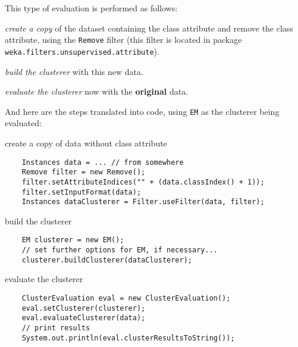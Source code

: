 This type of evaluation is performed as follows:
\begin{tight_enumerate}
	\item \textit{create a copy} of the dataset containing the class attribute
and remove the class attribute, using the \texttt{Remove} filter (this
filter is located in package \texttt{weka.filters.unsupervised.attribute}).
	\item \textit{build the clusterer} with this new data.
	\item \textit{evaluate the clusterer} now with the \textbf{original} data.
\end{tight_enumerate}
And here are the steps translated into code, using \texttt{EM} as the
clusterer being evaluated:
\begin{tight_enumerate}
	\item create a copy of data without class attribute
	\begin{verbatim}
    Instances data = ... // from somewhere
    Remove filter = new Remove();
    filter.setAttributeIndices("" + (data.classIndex() + 1));
    filter.setInputFormat(data);
    Instances dataClusterer = Filter.useFilter(data, filter);
	\end{verbatim}

	\item build the clusterer
	\begin{verbatim}
    EM clusterer = new EM();
    // set further options for EM, if necessary...
    clusterer.buildClusterer(dataClusterer);
	\end{verbatim}

	\item evaluate the clusterer
	\begin{verbatim}
    ClusterEvaluation eval = new ClusterEvaluation();
    eval.setClusterer(clusterer);
    eval.evaluateClusterer(data);
    // print results
    System.out.println(eval.clusterResultsToString());
	\end{verbatim}
\end{tight_enumerate}

\newpage

